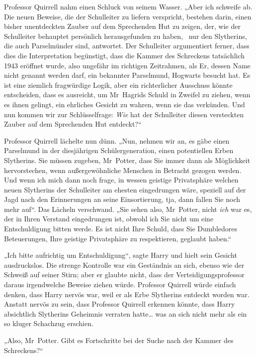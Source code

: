 {Professor Quirrell nahm einen Schluck von seinem Wasser. „Aber ich schweife ab. Die neuen Beweise, die der Schulleiter zu liefern verspricht, bestehen darin, einen bisher unentdeckten Zauber auf dem Sprechenden Hut zu zeigen, der, wie der Schulleiter behauptet persönlich herausgefunden zu haben, ~nur den Slytherins, die auch Parselmünder sind, antwortet. Der Schulleiter argumentiert ferner, dass dies die Interpretation begünstigt, dass die Kammer des Schreckens tatsächlich 1943 eröffnet wurde, also ungefähr im richtigen Zeitrahmen, als Er, dessen Name nicht genannt werden darf, ein bekannter Parselmund, Hogwarts besucht hat. Es ist eine ziemlich fragwürdige Logik, aber ein richterlicher Ausschuss könnte entscheiden, dass es ausreicht, um Mr~Hagrids Schuld in Zweifel zu ziehen, wenn es ihnen gelingt, ein ehrliches Gesicht zu wahren, wenn sie das verkünden. Und nun kommen wir zur Schlüsselfrage: \emph{Wie} hat der Schulleiter diesen versteckten Zauber auf dem Sprechenden Hut entdeckt?“

Professor Quirrell lächelte nun dünn. „Nun, nehmen wir an, es gäbe einen Parselmund in der diesjährigen Schülergeneration, einen potentiellen Erben Slytherins. Sie müssen zugeben, Mr~Potter, dass Sie immer dann als Möglichkeit hervorstechen, wenn außergewöhnliche Menschen in Betracht gezogen werden. Und wenn ich mich dann noch frage, in wessen geistige Privatsphäre welchen neuen Slytherins der Schulleiter am ehesten eingedrungen wäre, speziell auf der Jagd nach den Erinnerungen an seine Einsortierung, tja, dann fallen Sie noch mehr auf“. Das Lächeln verschwand. „Sie sehen also, Mr~Potter, nicht \emph{ich} war es, der in Ihren Verstand eingedrungen ist, obwohl ich Sie nicht um eine Entschuldigung bitten werde. Es ist nicht Ihre Schuld, dass Sie Dumbledores Beteuerungen, Ihre geistige Privatsphäre zu respektieren, geglaubt haben.“

„Ich bitte aufrichtig um Entschuldigung“, sagte Harry und hielt sein Gesicht ausdruckslos. Die strenge Kontrolle war ein Geständnis an sich, ebenso wie der Schweiß auf seiner Stirn; aber er glaubte nicht, dass der Verteidigungsprofessor daraus irgendwelche Beweise ziehen würde. Professor Quirrell würde einfach denken, dass Harry nervös war, weil er als Erbe Slytherins entdeckt worden war. Anstatt nervös zu sein, dass Professor Quirrell erkennen könnte, dass Harry absichtlich Slytherins Geheimnis verraten hatte… was an sich nicht mehr als ein so kluger Schachzug erschien.

„Also, Mr~Potter. Gibt es Fortschritte bei der Suche nach der Kammer des Schreckens?“

}
